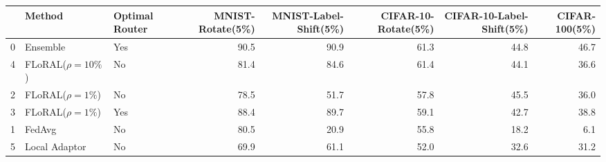 \begin{tabular}{lllrrrrr}
\toprule
 & Method & Optimal Router & MNIST-Rotate(5\%) & MNIST-Label-Shift(5\%) & CIFAR-10-Rotate(5\%) & CIFAR-10-Label-Shift(5\%) & CIFAR-100(5\%) \\
\midrule
0 & Ensemble & Yes & 90.5 & 90.9 & 61.3 & 44.8 & 46.7 \\
4 & FLoRAL($\rho=10\%$) & No & 81.4 & 84.6 & 61.4 & 44.1 & 36.6 \\
2 & FLoRAL($\rho=1\%$) & No & 78.5 & 51.7 & 57.8 & 45.5 & 36.0 \\
3 & FLoRAL($\rho=1\%$) & Yes & 88.4 & 89.7 & 59.1 & 42.7 & 38.8 \\
1 & FedAvg & No & 80.5 & 20.9 & 55.8 & 18.2 & 6.1 \\
5 & Local Adaptor & No & 69.9 & 61.1 & 52.0 & 32.6 & 31.2 \\
\bottomrule
\end{tabular}
